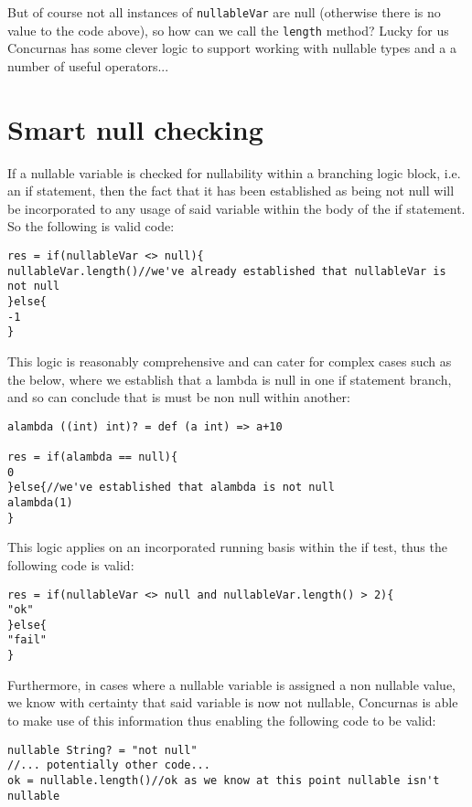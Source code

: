 \documentclass[conc-doc]{subfiles}
\begin{document}
But of course not all instances of \lstinline{nullableVar} are null (otherwise there is no value to the code above), so how can we call the \lstinline{length} method? Lucky for us Concurnas has some clever logic to support working with nullable types and a a number of useful operators...

\section{Smart null checking}
If a nullable variable is checked for nullability within a branching logic block, i.e. an if statement, then the fact that it has been established as being not null will be incorporated to any usage of said variable within the body of the if statement. So the following is valid code:

\begin{lstlisting}
res = if(nullableVar <> null){
nullableVar.length()//we've already established that nullableVar is not null
}else{
-1
}
\end{lstlisting}

This logic is reasonably comprehensive and can cater for complex cases such as the below, where we establish that a lambda is null in one if statement branch, and so can conclude that is must be non null within another:

\begin{lstlisting}
alambda ((int) int)? = def (a int) => a+10

res = if(alambda == null){
0
}else{//we've established that alambda is not null
alambda(1)
}
\end{lstlisting}

This logic applies on an incorporated running basis within the if test, thus the following code is valid:

\begin{lstlisting}
res = if(nullableVar <> null and nullableVar.length() > 2){
"ok"
}else{
"fail"
}
\end{lstlisting}


Furthermore, in cases where a nullable variable is assigned a non nullable value, we know with certainty that said variable is now not nullable, Concurnas is able to make use of this information thus enabling the following code to be valid:

\begin{lstlisting}
nullable String? = "not null"
//... potentially other code...
ok = nullable.length()//ok as we know at this point nullable isn't nullable
\end{lstlisting}
\end{document}
